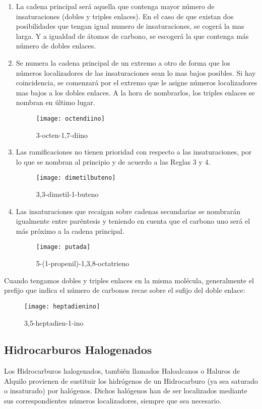 \begin{enumerate}
	\setcounter{enumi}{\value{nx}}
	\item La cadena principal será aquella que contenga mayor número de insaturaciones (dobles y triples enlaces). En el caso de que existan dos posibilidades que tengan igual numero de insaturaciones, se cogerá la mas larga. Y a igualdad de átomos de carbono, se escogerá la que contenga más número de dobles enlaces.\\
	
	\item Se numera la cadena principal de un extremo a otro de forma que los números localizadores de las insaturaciones sean lo mas bajos posibles. Si hay coincidencia, se comenzará por el extremo que le asigne números localizadores mas bajos a los dobles enlaces. A la hora de nombrarlos, los triples enlaces se nombran en último lugar.
	\begin{figure}[h!]
		\centering
		\texttt{[image: octendiino]}
		\captionsetup{labelformat=empty}
		\caption{3-octen-1,7-diino}
	\end{figure}
	\item Las ramificaciones no tienen prioridad con respecto a las insaturaciones, por lo que se nombran al principio y de acuerdo a las Reglas 3 y 4.
	\begin{figure}[h!]
		\centering
		\texttt{[image: dimetilbuteno]}
		\captionsetup{labelformat=empty}
		\caption{3,3-dimetil-1-buteno}
	\end{figure}
	\item Las insaturaciones que recaigan sobre cadenas secundarias se nombrarán igualmente entre paréntesis y teniendo en cuenta que el carbono uno será el más próximo a la cadena principal.
	\begin{figure}[h!]
		\centering
		\texttt{[image: putada]}
		\captionsetup{labelformat=empty}
		\caption{5-(1-propenil)-1,3,8-octatrieno}
	\end{figure}
\end{enumerate}
Cuando tengamos dobles y triples enlaces en la misma molécula, generalmente el prefijo que indica el número de carbonos recae sobre el sufijo del doble enlace:\\

\begin{figure}[h!]
	\centering
	\texttt{[image: heptadienino]}
	\captionsetup{labelformat=empty}
	\caption{3,5-heptadien-1-ino}
\end{figure}
\subsection{Hidrocarburos Halogenados}
Los Hidrocarburos halogenados, también llamados Haloalcanos o Haluros de Alquilo provienen de sustituir los hidrógenos de un Hidrocarburo (ya sea saturado o insaturado) por halógenos. Dichos halógenos han de ser localizados mediante sus correspondientes números localizadores, siempre que sea necesario.

